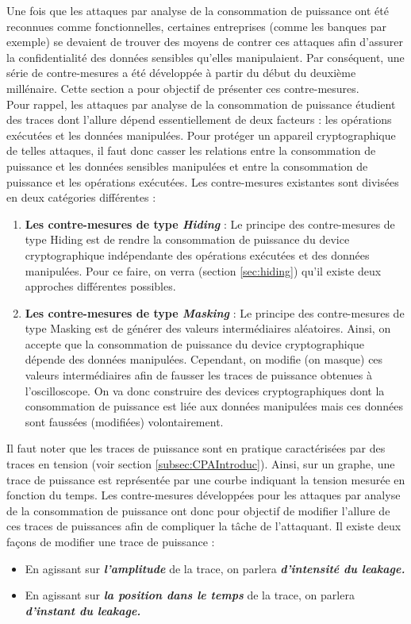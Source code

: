\documentclass[oneside]{book}
\begin{document}
\vspace{-0.2 cm}Une fois que les attaques par analyse de la consommation de puissance ont été reconnues comme fonctionnelles, certaines entreprises (comme les banques par exemple) se devaient de trouver des moyens de contrer ces attaques afin d'assurer la confidentialité des données sensibles qu'elles manipulaient. Par conséquent, une série de contre-mesures a été développée à partir du début du deuxième millénaire. Cette section a pour objectif de présenter ces contre-mesures. \\ Pour rappel, les attaques par analyse de la consommation de puissance étudient des traces dont l'allure dépend essentiellement de deux facteurs : les opérations exécutées et les données manipulées. Pour protéger un appareil cryptographique de telles attaques, il faut donc casser les relations entre la consommation de puissance et les données sensibles manipulées et entre la consommation de puissance et les opérations exécutées. Les contre-mesures existantes sont divisées en deux catégories différentes : 
\begin{enumerate}
\item \textbf{Les contre-mesures de type \textit{Hiding}} : Le principe des contre-mesures de type Hiding est de rendre la consommation de puissance du device cryptographique indépendante des opérations exécutées et des données manipulées. Pour ce faire, on verra (section \ref{sec:hiding}) qu'il existe deux approches différentes possibles.
\item \textbf{Les contre-mesures de type \textit{Masking}} : Le principe des contre-mesures de type Masking est de générer des valeurs intermédiaires aléatoires. Ainsi, on accepte que la consommation de puissance du device cryptographique dépende des données manipulées. Cependant, on modifie (on masque) ces valeurs intermédiaires afin de fausser les traces de puissance obtenues à l'oscilloscope. On va donc construire des devices cryptographiques dont la consommation de puissance est liée aux données manipulées mais ces données sont faussées (modifiées) volontairement. \\
\end{enumerate}

\vspace{-0.2 cm}Il faut noter que les traces de puissance sont en pratique caractérisées par des traces en tension (voir section \ref{subsec:CPAIntroduc}). Ainsi, sur un graphe, une trace de puissance est représentée par une courbe indiquant la tension mesurée en fonction du temps. Les contre-mesures développées pour les attaques par analyse de la consommation de puissance ont donc pour objectif de modifier l'allure de ces traces de puissances afin de compliquer la tâche de l'attaquant. Il existe deux façons de modifier une trace de puissance : 
\begin{itemize}
\item En agissant sur \textbf{\textit{l'amplitude}} de la trace, on parlera \textbf{\textit{d'intensité du leakage.}}
\item En agissant sur \textbf{\textit{la position dans le temps}} de la trace, on parlera \textbf{\textit{d'instant du leakage.}} \\
\end{itemize}
\end{document}
